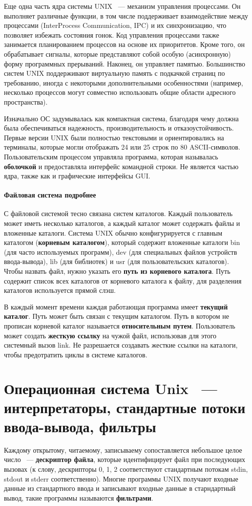 \documentclass[11pt]{article}
\begin{document}
	Еще одна часть ядра системы UNIX ~--- механизм управления процессами. Он выполняет различные функции, в том числе поддерживает взаимодействие между процессами (InterProcess Communication, IPC) и их синхронизацию, что позволяет избежать состояния гонок. Код управления процессами также занимается планированием процессов на основе их приоритетов. Кроме того, он обрабатывает сигналы, которые представляют собой особую (асинхронную) форму программных прерываний. Наконец, он управляет памятью. Большинство систем UNIX поддерживают виртуальную память с подкачкой страниц по требованию, иногда с некоторыми дополнительными особенностями (например, несколько процессов могут совместно использовать общие области адресного пространства).

	Изначально ОС задумывалась как компактная система, благодаря чему должна была обеспечиваться надежность, производительность и отказоустойчивость. Первые версии UNIX были полностью текстовыми и ориентировались на терминалы, которые могли отображать 24 или 25 строк по 80 ASCII-символов. Пользовательским процессом управляла программа, которая называлась \textbf{оболочкой} и предоставляла интерфейс командной строки. Не является частью ядра, также как и графические интерфейсы GUI.
	\paragraph{Файловая система подробнее}
	С файловой системой тесно связана систем каталогов. Каждый пользователь может иметь несколько каталогов, а каждый каталог может содержать файлы и вложенные каталоги. Система UNIX обычно конфигурируется с главным каталогом (\textbf{корневым каталогом}), который содержит вложенные каталоги bin (для часто используемых программ), dev (для специальных файлов устройств ввода-вывода), lib (для библиотек) и usr (для пользовательских каталогов). Чтобы назвать файл, нужно указать его \textbf{путь из корневого каталога}. Путь содержит список всех каталогов от корневого каталога к файлу, для разделения каталогов используется прямой слэш.

	В каждый момент времени каждая работающая программа имеет \textbf{текущий каталог}. Путь может быть связан с текущим каталогом. Путь в котором не прописан корневой каталог называется \textbf{относительным путем}. Пользователь может создать \textbf{ жесткую ссылку} на чужой файл, использовав для этого системный вызов link. Не разрешается создавать жесткие ссылки на каталоги, чтобы предотратить циклы в системе каталогов.

	\section{Операционная система Unix ~--- интерпретаторы, стандартные потоки ввода-вывода, фильтры}
	Каждому открытому, читаемому, записываему сопоставляется небольшое целое число ~--- \textbf{дескриптор файла}, которые идентифицирует файл при последующих вызовах (к слову, дескрипторы 0, 1, 2 соответствуют стандартным потокам stdin, stdout и stderr соответственно). Многие программы UNIX получают входные данные из стандартного ввода и записывают входные данные в старндартный вывод, такие программы называются \textbf{фильтрами}.
\end{document}
